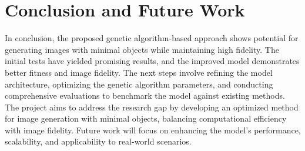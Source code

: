 \documentclass[10pt, conference]{IEEEtran}
\begin{document}
\section{Conclusion and Future Work}
In conclusion, the proposed genetic algorithm-based approach shows potential for generating images with minimal objects while maintaining high fidelity. The initial tests have yielded promising results, and the improved model demonstrates better fitness and image fidelity. The next steps involve refining the model architecture, optimizing the genetic algorithm parameters, and conducting comprehensive evaluations to benchmark the model against existing methods. The project aims to address the research gap by developing an optimized method for image generation with minimal objects, balancing computational efficiency with image fidelity. Future work will focus on enhancing the model's performance, scalability, and applicability to real-world scenarios.
\end{document}
